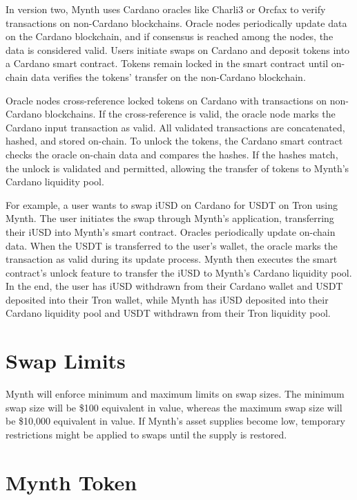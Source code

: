 In version two, Mynth uses Cardano oracles like Charli3 or Orcfax to
verify transactions on non-Cardano blockchains. Oracle nodes
periodically update data on the Cardano blockchain, and if consensus is
reached among the nodes, the data is considered valid. Users initiate
swaps on Cardano and deposit tokens into a Cardano smart contract.
Tokens remain locked in the smart contract until on-chain data veriﬁes
the tokens' transfer on the non-Cardano blockchain.

Oracle nodes cross-reference locked tokens on Cardano with transactions
on non-Cardano blockchains. If the cross-reference is valid, the oracle
node marks the Cardano input transaction as valid. All validated
transactions are concatenated, hashed, and stored on-chain. To unlock
the tokens, the Cardano smart contract checks the oracle on-chain data
and compares the hashes. If the hashes match, the unlock is validated
and permitted, allowing the transfer of tokens to Mynth's Cardano
liquidity pool.

For example, a user wants to swap iUSD on Cardano for USDT on Tron using
Mynth. The user initiates the swap through Mynth's application,
transferring their iUSD into Mynth's smart contract. Oracles
periodically update on-chain data. When the USDT is transferred to the
user's wallet, the oracle marks the transaction as valid during its
update process. Mynth then executes the smart contract's unlock feature
to transfer the iUSD to Mynth's Cardano liquidity pool. In the end, the
user has iUSD withdrawn from their Cardano wallet and USDT deposited
into their Tron wallet, while Mynth has iUSD deposited into their
Cardano liquidity pool and USDT withdrawn from their Tron liquidity
pool.

\hypertarget{swap-limits}{%
\section{Swap Limits}\label{swap-limits}}

Mynth will enforce minimum and maximum limits on swap sizes. The minimum
swap size will be \$100 equivalent in value, whereas the maximum swap
size will be \$10,000 equivalent in value. If Mynth's asset supplies
become low, temporary restrictions might be applied to swaps until the
supply is restored.

\hypertarget{mynth-token}{%
\section{Mynth Token}\label{mynth-token}}

